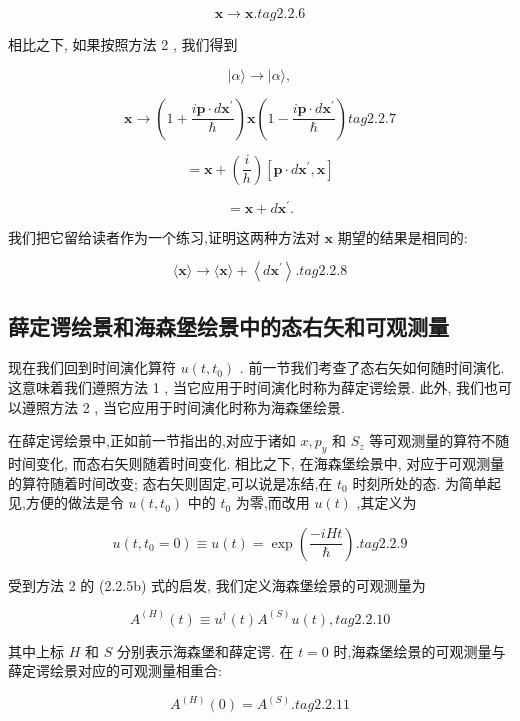 \documentclass[lang=cn,newtx,10pt,scheme=chinese,thmcnt=section]{elegantbook}
\begin{document}
$$
\mathbf{x} \rightarrow \mathbf{x}\text{.} tag{2. 2.6}
$$

相比之下, 如果按照方法 2 , 我们得到

$$
\left| {\alpha \rangle \rightarrow }\right| \alpha \rangle ,
$$

$$
\mathbf{x} \rightarrow \left( {1 + \frac{i\mathbf{p} \cdot d{\mathbf{x}}^{\prime }}{\hbar }}\right) \mathbf{x}\left( {1 - \frac{i\mathbf{p} \cdot d{\mathbf{x}}^{\prime }}{\hbar }}\right) tag{2.2.7}
$$

$$
= \mathbf{x} + \left( \frac{i}{h}\right) \left\lbrack {\mathbf{p} \cdot d{\mathbf{x}}^{\prime },\mathbf{x}}\right\rbrack
$$

$$
= \mathbf{x} + d{\mathbf{x}}^{\prime }\text{.}
$$

我们把它留给读者作为一个练习,证明这两种方法对 $\mathbf{x}$ 期望的结果是相同的:

$$
\langle \mathbf{x}\rangle \rightarrow \langle \mathbf{x}\rangle + \left\langle {d{\mathbf{x}}^{\prime }}\right\rangle . tag{2.2.8}
$$

\subsection*{薛定谔绘景和海森堡绘景中的态右矢和可观测量}

现在我们回到时间演化算符 $u\left( {t,{t}_{0}}\right)$ . 前一节我们考查了态右矢如何随时间演化. 这意味着我们遵照方法 1 , 当它应用于时间演化时称为薛定谔绘景. 此外, 我们也可以遵照方法 2 , 当它应用于时间演化时称为海森堡绘景.

在薛定谔绘景中,正如前一节指出的,对应于诸如 $x,{p}_{y}$ 和 ${S}_{z}$ 等可观测量的算符不随时间变化, 而态右矢则随着时间变化. 相比之下, 在海森堡绘景中, 对应于可观测量的算符随着时间改变; 态右矢则固定,可以说是冻结,在 ${t}_{0}$ 时刻所处的态. 为简单起见,方便的做法是令 $u\left( {t,{t}_{0}}\right)$ 中的 ${t}_{0}$ 为零,而改用 $u\left( t\right)$ ,其定义为

$$
u\left( {t,{t}_{0} = 0}\right) \equiv u\left( t\right) = \exp \left( \frac{-{iHt}}{\hbar }\right) . tag{2.2.9}
$$

受到方法 2 的 (2.2.5b) 式的启发, 我们定义海森堡绘景的可观测量为

$$
{A}^{\left( H\right) }\left( t\right) \equiv {u}^{ \dagger }\left( t\right) {A}^{\left( S\right) }u\left( t\right) , tag{2.2.10}
$$

其中上标 $H$ 和 $S$ 分别表示海森堡和薛定谔. 在 $t = 0$ 时,海森堡绘景的可观测量与薛定谔绘景对应的可观测量相重合:

$$
{A}^{\left( H\right) }\left( 0\right) = {A}^{\left( S\right) }. tag{2.2.11}
$$
\end{document}
